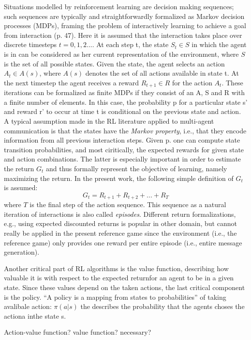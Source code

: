 Situations modelled by reinforcement learning are decision making sequences; such sequences are typically and straightforwardly formalized as Markov decision processes (MDPs), framing the problem of interactively learning to achieve a goal from interaction (p. 47). Here it is assumed that the interaction takes place over discrete timesteps $t = 0, 1,2 ...$. At each step t, the state $S_t \in S$ in which the agent is in can be considered as her current representation of the environment, where $S$ is the set of all possible states. Given the state, the agent selects an action $A_t \in A(s)$, where $A(s)$ denotes the set of all actions available in state t. At the next timestep the agent receives a reward $R_{t+1} \in R$ for the action $A_t$. These iterations can be formalized as finite MDPs if they consist of an A, S and R with a finite number of elements. In this case, the probability p for a particular state s' and reward r' to occur at time t is conditional on the previous state and action. A typical assumption made in the RL literature applied to multi-agent communication is that the states have the \textit{Markov property}, i.e., that they encode information from all previous interaction steps. Given p. one can compute state transition probabilities, and most ciritically, the expected rewards for given state and action combinations. The latter is especially important in order to estimate the return $G_t$ and thus formally represent the objective of learning, namely maximizing the return. In the present work, the following simple definition of $G_t$ is assumed: 
$$G_t = R_{t+1} + R_{t+2} + ... + R_T$$ where $T$ is the final step of the action sequence. This sequence as a natural iteration of interactions is also called \textit{episodes}.  Different return formalizations, e.g., using expected discounted returns is popular in other domain, but cannot really be applied in the present reference game since the environment (i.e., the reference game) only provides one reward per entire episode (i.e., entire message generation). 

Another critical part of RL algorithms is the value function, describing how valuable it is with respect to the expected returnfor an agent to be in a given state. Since these values depend on the taken actions, the last critical component is the policy. ``A policy is a mapping from states to probabilities'' of taking avalibale action: $\pi(a | s)$ the describes the probability that the agents choses the actiona inthe state s.

Action-value function? value function? necessary?

